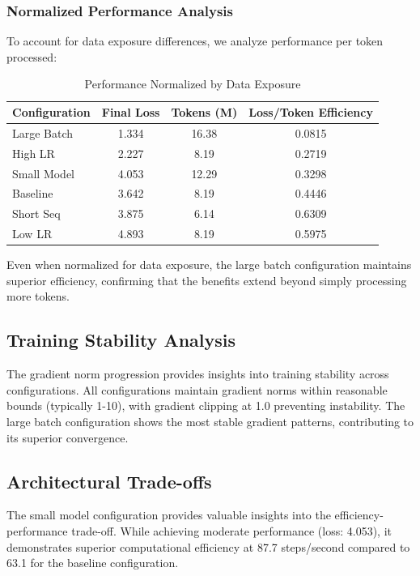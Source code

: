 \documentclass[11pt,a4paper]{article}
\begin{document}
\subsubsection{Normalized Performance Analysis}
To account for data exposure differences, we analyze performance per token processed:

\begin{table}[H]
\centering
\caption{Performance Normalized by Data Exposure}
\label{tab:normalized_perf}
\begin{tabular}{@{}lccc@{}}
\toprule
Configuration & Final Loss & Tokens (M) & Loss/Token Efficiency \\
\midrule
Large Batch & 1.334 & 16.38 & 0.0815 \\
High LR & 2.227 & 8.19 & 0.2719 \\
Small Model & 4.053 & 12.29 & 0.3298 \\
Baseline & 3.642 & 8.19 & 0.4446 \\
Short Seq & 3.875 & 6.14 & 0.6309 \\
Low LR & 4.893 & 8.19 & 0.5975 \\
\bottomrule
\end{tabular}
\end{table}

Even when normalized for data exposure, the large batch configuration maintains superior efficiency, confirming that the benefits extend beyond simply processing more tokens.

\subsection{Training Stability Analysis}
The gradient norm progression provides insights into training stability across configurations. All configurations maintain gradient norms within reasonable bounds (typically 1-10), with gradient clipping at 1.0 preventing instability. The large batch configuration shows the most stable gradient patterns, contributing to its superior convergence.

\subsection{Architectural Trade-offs}
The small model configuration provides valuable insights into the efficiency-performance trade-off. While achieving moderate performance (loss: 4.053), it demonstrates superior computational efficiency at 87.7 steps/second compared to 63.1 for the baseline configuration.
\end{document}
